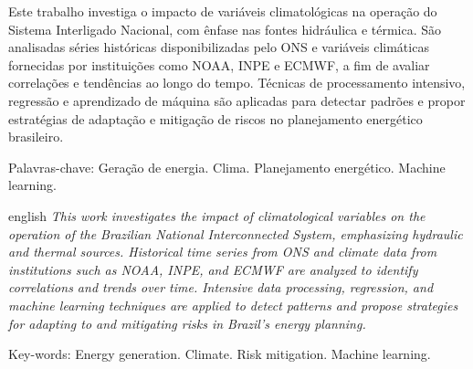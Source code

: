 \begin{resumo}
	\noindent
	Este trabalho investiga o impacto de variáveis climatológicas na operação do Sistema Interligado Nacional, com ênfase nas
	fontes hidráulica e térmica. São analisadas séries históricas disponibilizadas pelo ONS e variáveis climáticas
	fornecidas por instituições como NOAA, INPE e ECMWF, a fim de avaliar correlações e tendências ao longo do tempo. Técnicas de
	processamento intensivo, regressão e aprendizado de máquina são aplicadas para detectar padrões e propor estratégias de
	adaptação e mitigação de riscos no planejamento energético brasileiro.
	
	\vspace{0.2cm} 
	Palavras-chave: Geração de energia. Clima. Planejamento energético. Machine learning.
	\end{resumo}

\begin{resumo}[Abstract]	
 	\begin{otherlanguage*}{english}
 	\noindent 
	\textit{This work investigates the impact of climatological variables on the operation of the Brazilian National 
	Interconnected System, emphasizing hydraulic and thermal sources. Historical time series from ONS and climate 
	data from institutions such as NOAA, INPE, and ECMWF are analyzed to identify correlations and trends over time.
	Intensive data processing, regression, and machine learning techniques are applied to detect patterns and propose 
	strategies for adapting to and mitigating risks in Brazil’s energy planning.
	} 
   \vspace{0.2cm}
 
   
    Key-words: Energy generation. Climate. Risk mitigation. Machine learning.
 	\end{otherlanguage*}
\end{resumo}